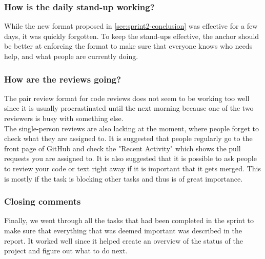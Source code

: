 \subsubsection*{How is the daily stand-up working?}
While the new format proposed in \autoref{sec:sprint2-conclusion} was effective for a few days, it was quickly forgotten.
To keep the stand-ups effective, the anchor should be better at enforcing the format to make sure that everyone knows who needs help, and what people are currently doing.

\subsubsection*{How are the reviews going?}
The pair review format for code reviews does not seem to be working too well since it is usually procrastinated until the next morning because one of the two reviewers is busy with something else.
\\
The single-person reviews are also lacking at the moment, where people forget to check what they are assigned to.
It is suggested that people regularly go to the front page of GitHub and check the "Recent Activity" which shows the pull requests you are assigned to.
It is also suggested that it is possible to ask people to review your code or text right away if it is important that it gets merged.
This is mostly if the task is blocking other tasks and thus is of great importance.


\subsubsection*{Closing comments}
Finally, we went through all the tasks that had been completed in the sprint to make sure that everything that was deemed important was described in the report.
It worked well since it helped create an overview of the status of the project and figure out what to do next.
